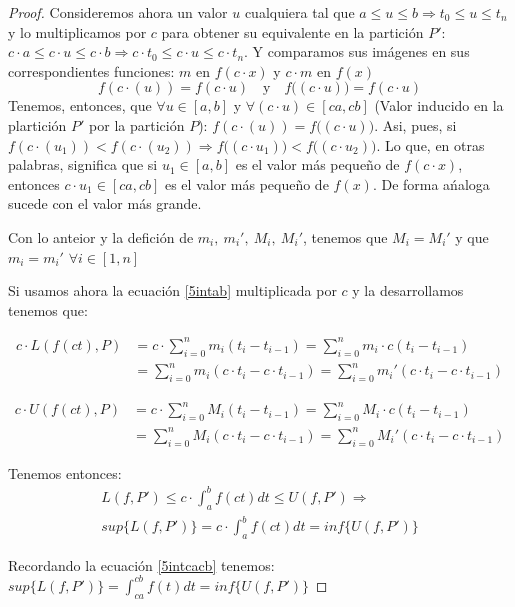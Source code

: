 \documentclass[12pt]{article}
\begin{document}
\begin{proof}
    Consideremos ahora un valor $u$ cualquiera tal que \(a\leq u\leq b \Longrightarrow t_{0}\leq u\leq t_n\) y lo multiplicamos por $c$ para obtener su equivalente en la partici\'on $P'$: \(c\cdot a\leq c\cdot u\leq c\cdot b \Longrightarrow c\cdot t_{0}\leq c\cdot u\leq c\cdot t_n\).\bigskip
    Y comparamos sus im\'agenes en sus correspondientes funciones: $m$ en \(f(c\cdot x)\) y $c\cdot m$ en \(f(x)\)
    \[f(c\cdot (u))=f(c\cdot u) \quad \text{y}  \quad f\big((c\cdot u)\big)=f(c\cdot u)\]
    Tenemos, entonces, que \(\forall u\in[a,b]\) y \(\forall (c\cdot u) \in [ca,cb]\) (Valor inducido en la plartici\'on $P'$ por la partici\'on $P$): \(f(c\cdot (u))=f\big((c\cdot u)\big)\).\bigskip
    Asi, pues, si \(f(c\cdot (u_1))<f(c\cdot (u_2)) \Longrightarrow f\big((c\cdot u_1)\big)<f\big((c\cdot u_2)\big)\). Lo que, en otras palabras, significa que si \(u_1\in[a,b]\) es el valor m\'as pequeño de $f(c\cdot x)$, entonces \(c\cdot u_1\in[ca,cb]\) es el valor m\'as pequeño de $f(x)$. De forma a\'naloga sucede con el valor m\'as grande.\bigskip

    Con lo anteior y la defici\'on de \(m_i, \ m_i', \ M_i, \ M_i'\), tenemos que \(M_i=M_i'\) y que \(m_i=m_i'\) \(\forall i\in[1,n]\)

    Si usamos ahora la ecuaci\'on \eqref{5intab} multiplicada por $c$ y la desarrollamos tenemos que:

    \begin{align*}
        c\cdot L(f(ct),P) &= c \cdot \sum_{i=0}^n m_i(t_i-t_{i-1}) = \sum_{i=0}^n m_i\cdot c(t_i-t_{i-1}) \\
        &= \sum_{i=0}^n m_i(c\cdot t_i-c\cdot t_{i-1}) = \sum_{i=0}^n m_i'(c\cdot t_i-c\cdot t_{i-1})
    \end{align*}

    \begin{align*}
        c\cdot U(f(ct),P) &= c \cdot \sum_{i=0}^n M_i(t_i-t_{i-1}) = \sum_{i=0}^n M_i\cdot c(t_i-t_{i-1}) \\
        &= \sum_{i=0}^n M_i(c\cdot t_i-c\cdot t_{i-1}) = \sum_{i=0}^n M_i'(c\cdot t_i-c\cdot t_{i-1})
    \end{align*}

    Tenemos entonces:
    \begin{multline*}
        L(f,P')\leq c\cdot\int_{a}^{b}f(ct)dt\leq U(f,P') \Longrightarrow \\ sup\{L(f,P')\}=c\cdot\int_{a}^{b}f(ct)dt=inf\{U(f,P')\}
    \end{multline*}

    Recordando la ecuaci\'on \eqref{5intcacb} tenemos: \(sup\{L(f,P')\}=\displaystyle\int_{ca}^{cb}f(t)dt=inf\{U(f,P')\}\)


\end{proof}
\end{document}
